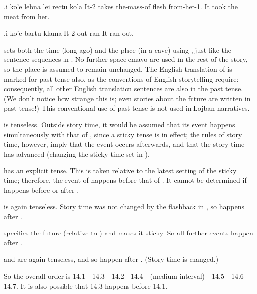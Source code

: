 \begin{example}
.i ko'e lebna lei rectu ko'a\n
It-2  takes the-mass-of flesh from-her-1.\n
It took the meat from her.
\end{example}

\begin{example}
.i ko'e bartu klama\n
It-2 out ran\n
It ran out.
\end{example}

 sets both the time (long ago)
    and the place (in a cave) using , just like the sentence
    sequences in . No further space
    cmavo are used in the rest of the story, so the place is
    assumed to remain unchanged. The English translation of  is marked for past tense also,
    as the conventions of English storytelling require:
    consequently, all other English translation sentences are also
    in the past tense. (We don't notice how strange this is; even
    stories about the future are written in past tense!) This
    conventional use of past tense is not used in Lojban
    narratives. 

 is tenseless. Outside
    story time, it would be assumed that its event happens
    simultaneously with that of ,
    since a sticky tense is in effect; the rules of story time,
    however, imply that the event occurs afterwards, and that the
    story time has advanced (changing the sticky time set in ).

 has an explicit tense.
    This is taken relative to the latest setting of the sticky
    time; therefore, the event of 
    happens before that of . It
    cannot be determined if 
    happens before or after .

 is again tenseless. Story
    time was not changed by the flashback in , so  happens after .

 specifies the future
    (relative to ) and makes it
    sticky. So all further events happen after .

 and  are again tenseless, and so
    happen after . (Story time is
    changed.)

So the overall order is 14.1 - 14.3 - 14.2 - 14.4 - (medium
    interval) - 14.5 - 14.6 - 14.7. It is also possible that 14.3
    happens before 14.1.

